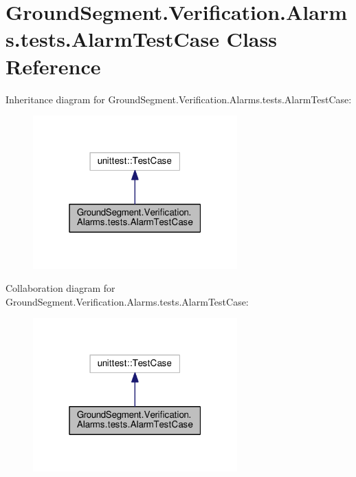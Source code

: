 \hypertarget{class_ground_segment_1_1_verification_1_1_alarms_1_1tests_1_1_alarm_test_case}{}\section{Ground\+Segment.\+Verification.\+Alarms.\+tests.\+Alarm\+Test\+Case Class Reference}
\label{class_ground_segment_1_1_verification_1_1_alarms_1_1tests_1_1_alarm_test_case}


Inheritance diagram for Ground\+Segment.\+Verification.\+Alarms.\+tests.\+Alarm\+Test\+Case\+:\nopagebreak
\begin{figure}[H]
\begin{center}
\leavevmode
\includegraphics[width=223pt]{class_ground_segment_1_1_verification_1_1_alarms_1_1tests_1_1_alarm_test_case__inherit__graph}
\end{center}
\end{figure}


Collaboration diagram for Ground\+Segment.\+Verification.\+Alarms.\+tests.\+Alarm\+Test\+Case\+:\nopagebreak
\begin{figure}[H]
\begin{center}
\leavevmode
\includegraphics[width=223pt]{class_ground_segment_1_1_verification_1_1_alarms_1_1tests_1_1_alarm_test_case__coll__graph}
\end{center}
\end{figure}
